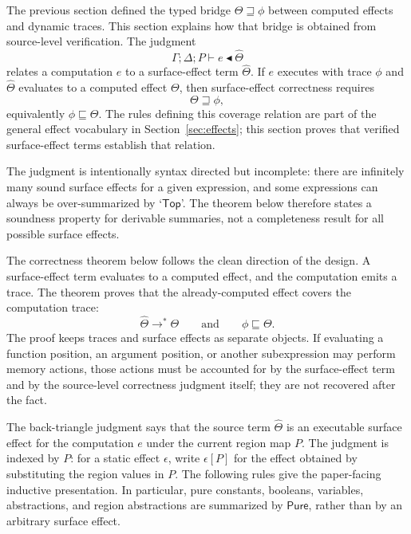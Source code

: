 \documentclass[10pt,a4paper]{article}
\newcommand{\desc}{\mathrel{\blacktriangleleft}}      %
\newcommand{\approxx}{\mathrel{\sqsubseteq}}          %
\newcommand{\Top}{\mathsf{Top}}
\newcommand{\Pure}{\mathsf{Pure}}
\newcommand{\thetahat}{\widehat{\Theta}}
\newcommand{\covers}{\mathrel{\sqsupseteq}}
\begin{document}
The previous section defined the typed bridge $\Theta\covers\phi$ between
computed effects and dynamic traces. This section explains how that bridge is
obtained from source-level verification. The judgment
\[
  \Gamma;\Delta;P \vdash e \desc \thetahat
\]
relates a computation $e$ to a surface-effect term $\thetahat$. If $e$ executes
with trace $\phi$ and $\thetahat$ evaluates to a computed effect $\Theta$, then
surface-effect correctness requires
\[
  \Theta\covers\phi,
\]
equivalently $\phi\approxx\Theta$.  The rules defining this coverage relation
are part of the general effect vocabulary in Section~\ref{sec:effects}; this
section proves that verified surface-effect terms establish that relation.

The judgment is intentionally syntax directed but incomplete: there are
infinitely many sound surface effects for a given expression, and some expressions can
always be over-summarized by `$\Top$'.  The theorem below therefore states a
soundness property for derivable summaries, not a completeness result for all
possible surface effects.


The correctness theorem below follows the clean direction of the design.
A surface-effect term evaluates to a computed effect, and the computation emits
a trace.  The theorem proves that the already-computed effect covers the
computation trace:
\[
\widehat{\Theta}\longrightarrow^{*}\Theta
\qquad\text{and}\qquad
\phi\approxx\Theta.
\]
The proof keeps traces and surface effects as separate objects.  If evaluating
a function position, an argument position, or another subexpression may perform
memory actions, those actions must be accounted for by the surface-effect term
and by the source-level correctness judgment itself; they are not recovered
after the fact.

\noindent The back-triangle judgment says that the source term
$\thetahat$ is an executable surface effect for the computation $e$ under the
current region map $P$. The judgment is indexed by $P$: for a static effect
$\epsilon$, write $\epsilon[P]$ for the effect obtained by substituting the
region values in $P$. The following rules give the paper-facing inductive
presentation. In particular, pure constants, booleans, variables, abstractions,
and region abstractions are summarized by $\Pure$, rather than by an arbitrary
surface effect.
\end{document}
